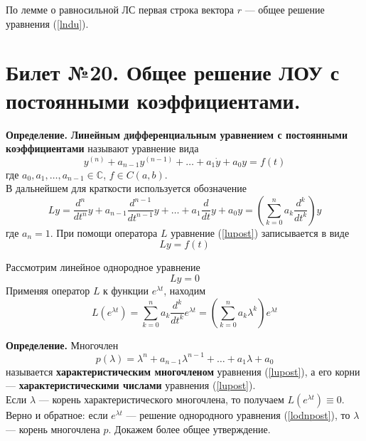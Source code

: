 \documentclass{article}
\begin{document}
По лемме о равносильной ЛС первая строка вектора $r$ --- общее решение уравнения (\ref{lndu}).

\section{Билет №20. Общее решение ЛОУ с постоянными коэффициентами.}
\textbf{Определение.} \textbf{Линейным дифференциальным уравнением с постоянными коэффициентами} называют уравнение вида
\begin{equation}
    y^{(n)} + a_{n - 1}y^{(n-1)} + \ldots + a_1\dot{y} + a_0y = f(t) \label{lupost}
\end{equation}
где $a_0, a_1, \ldots, a_{n-1} \in \mathbb{C}$, $f \in C(a,b)$.\\

В дальнейшем для краткости используется обозначение
\begin{equation*}
    Ly = \frac{d^n}{dt^n}y + a_{n-1}\frac{d^{n-1}}{dt^{n-1}}y + \ldots + a_1\frac{d}{dt}y + a_0y = \left(\sum_{k = 0}^n a_k\frac{d^k}{dt^k} \right)y
\end{equation*}
где $a_n = 1$. При помощи оператора $L$ уравнение (\ref{lupost}) записывается в виде
\begin{equation*}
    Ly = f(t)
\end{equation*}

Рассмотрим линейное однородное уравнение
\begin{equation}
    Ly = 0 \label{lodnpost}
\end{equation}
Применяя оператор $L$ к функции $e^{\lambda t}$, находим
\begin{equation*}
    L(e^{\lambda t}) = \sum_{k = 0}^n a_k\frac{d^k}{dt^k}e^{\lambda t} = \left(\sum_{k = 0}^n a_k\lambda^k \right)e^{\lambda t}
\end{equation*}

\noindent \textbf{Определение.} Многочлен
\begin{equation*}
    p(\lambda) = \lambda^n + a_{n-1}\lambda^{n-1} + \ldots + a_1\lambda + a_0
\end{equation*}
называется \textbf{характеристическим многочленом} уравнения (\ref{lupost}), а его корни --- \textbf{характеристическими числами} уравнения (\ref{lupost}).\\

Если $\lambda$ --- корень характеристического многочлена, то получаем $L(e^{\lambda t}) \equiv 0$. Верно и обратное: если $e^{\lambda t}$ --- решение однородного уравнения (\ref{lodnpost}), то $\lambda$ --- корень многочлена $p$. Докажем более общее утверждение.\\
\end{document}
